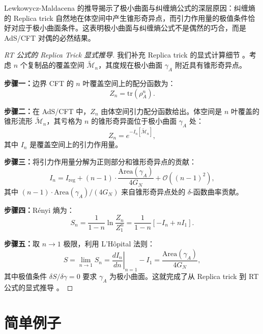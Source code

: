 \begin{remark}[推导的物理意义]
Lewkowycz-Maldacena 的推导揭示了极小曲面与纠缠熵公式的深层原因：纠缠熵的 Replica trick 自然地在体空间中产生锥形奇异点，而引力作用量的极值条件恰好对应于极小曲面条件。这表明极小曲面与纠缠熵公式不是偶然的巧合，而是 AdS/CFT 对偶的必然结果。
\end{remark}

\begin{proof}[RT 公式的 Replica Trick 显式推导]
我们补充 Replica trick 的显式计算细节 \cite{Lewkowycz2013}。考虑 $n$ 个复制品的覆盖空间 $\widetilde{\mathcal{M}}_n$，其度规在极小曲面 $\gamma_A$ 附近具有锥形奇异点。

\textbf{步骤一：}边界 CFT 的 $n$ 叶覆盖空间上的配分函数为：
\begin{equation}
    Z_n = \text{tr}(\rho_A^n).
\end{equation}

\textbf{步骤二：}在 AdS/CFT 中，$Z_n$ 由体空间引力配分函数给出。体空间是 $n$ 叶覆盖的锥形流形 $\widetilde{\mathcal{M}}_n$，其亏格为 $n$ 的锥形奇异面位于极小曲面 $\gamma_A$ 处：
\begin{equation}
    Z_n = e^{-I_n[\widetilde{\mathcal{M}}_n]},
\end{equation}
其中 $I_n$ 是覆盖空间上的引力作用量。

\textbf{步骤三：}将引力作用量分解为正则部分和锥形奇异点的贡献：
\begin{equation}
    I_n = I_{\text{reg}} + (n-1) \cdot \frac{\text{Area}(\gamma_A)}{4G_N} + \mathcal{O}\left((n-1)^2\right),
\end{equation}
其中 $(n-1) \cdot \text{Area}(\gamma_A)/(4G_N)$ 来自锥形奇异点处的 $\delta$-函数曲率贡献。

\textbf{步骤四：}Rényi 熵为：
\begin{equation}
    S_n = \frac{1}{1-n} \ln \frac{Z_n}{Z_1^n} = \frac{1}{1-n}\left[-I_n + n I_1\right].
\end{equation}

\textbf{步骤五：}取 $n \to 1$ 极限，利用 L'H\^opital 法则：
\begin{equation}
    S = \lim_{n \to 1} S_n = \left.\frac{d I_n}{d n}\right|_{n=1} - I_1 = \frac{\text{Area}(\gamma_A)}{4G_N},
\end{equation}
其中极值条件 $\delta S/\delta \gamma = 0$ 要求 $\gamma_A$ 为极小曲面。这就完成了从 Replica trick 到 RT 公式的显式推导 \cite{Ryu2006}。
\end{proof}

\section{简单例子}

